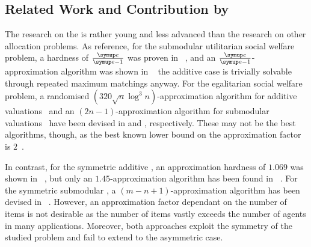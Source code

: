 \subsection[Related Work and Contribution]{Related Work and Contribution by \citeauthor{APNSWuSVþUM}}
\label{subsec:intro:contribution}

The research on the \NSW{} is rather young and less advanced than the research on other allocation problems.
As reference\footnotemark[1], for the submodular utilitarian social welfare problem, a hardness of \(\frac{\euler}{\euler - 1}\) was proven in \citeyear{inapprox_results_for_combi_auctions_with_submod_utility_funcs}~\cite{inapprox_results_for_combi_auctions_with_submod_utility_funcs}, and an \(\frac{\euler}{\euler - 1}\)-approximation algorithm was shown in \citeyear{opt_approx_for_the_submod_nsw_in_the_value_oracle_model}~\cite{opt_approx_for_the_submod_nsw_in_the_value_oracle_model} \Dash the additive case is trivially solvable through repeated maximum matchings anyway.
For the egalitarian social welfare problem, a randomised \((320 \sqrt{n} \log^3 n)\)-approximation algorithm for additive valuations~\cite{an_approx_algo_for_maxmin_fair_alloc_of_indiv_goods} and an \((2n-1)\)-approximation algorithm for submodular valuations~\cite{approx_algo_for_the_maxmin_alloc_problem} have been devised in \citeyear{an_approx_algo_for_maxmin_fair_alloc_of_indiv_goods} and \citeyear{approx_algo_for_the_maxmin_alloc_problem}, respectively.
These may not be the best algorithms, though, as the best known lower bound on the approximation factor is \(2\)~\cite{allocating_indiv_goods}.

In contrast, for the symmetric additive \NSW{}, an approximation hardness of \(1.069\) was shown in \citeyear{satiation_in_fisher_markets_and_approx_of_nsw}~\cite{satiation_in_fisher_markets_and_approx_of_nsw}, but only an \(1.45\)-approximation algorithm has been found in \citeyear{finding_fair_and_efficient_allocs}~\cite{finding_fair_and_efficient_allocs}.
For the symmetric submodular \NSW, a \((m - n + 1)\)-approximation algorithm has been devised in \citeyear{min_envy_and_max_avg_nsw_in_the_alloc_of_indiv_goods}~\cite{min_envy_and_max_avg_nsw_in_the_alloc_of_indiv_goods}.
However, an approximation factor dependant on the number of items is not desirable as the number of items vastly exceeds the number of agents in many applications.
Moreover, both approaches exploit the symmetry of the studied problem and fail to extend to the asymmetric case.

